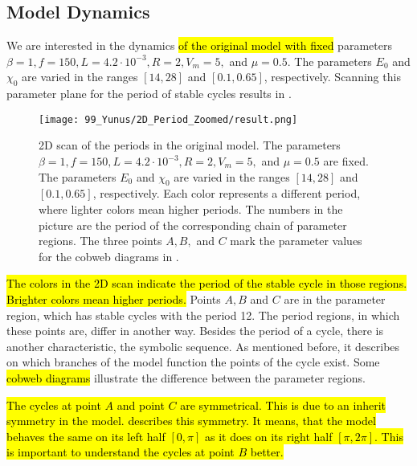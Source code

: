 \subsection{Model Dynamics}
\label{sec:state.og.dynamics}

We are interested in the dynamics \hl{of the original model with fixed} parameters $\beta = 1, f = 150, L = 4.2 \cdot 10^{-3}, R = 2, V_m = 5,$ and $\mu = 0.5$.
The parameters $E_0$ and $\chi_0$ are varied in the ranges $[14, 28]$ and $[0.1, 0.65]$, respectively.
Scanning this parameter plane for the period of stable cycles results in .

\begin{figure}
	\centering
	\texttt{[image: 99\_Yunus/2D\_Period\_Zoomed/result.png]}
	\caption[2D scan of the periods in the original model]{
		2D scan of the periods in the original model.
		The parameters $\beta = 1, f = 150, L = 4.2 \cdot 10^{-3}, R = 2, V_m = 5,$ and $\mu = 0.5$ are fixed.
		The parameters $E_0$ and $\chi_0$ are varied in the ranges $[14, 28]$ and $[0.1, 0.65]$, respectively.
		Each color represents a different period, where lighter colors mean higher periods.
		The numbers in the picture are the period of the corresponding chain of parameter regions.
		The three points $A, B,$ and $C$ mark the parameter values for the cobweb diagrams in .
	}
	\label{fig:setup.og.dynamics.period}
\end{figure}

\hl{
	The colors in the 2D scan  indicate the period of the stable cycle in those regions.
	Brighter colors mean higher periods.
}
Points $A, B$ and $C$ are in the parameter region, which has stable cycles with the period 12.
The period regions, in which these points are, differ in another way.
Besides the period of a cycle, there is another characteristic, the symbolic sequence.
As mentioned before, it describes on which branches of the model function the points of the cycle exist.
Some \hl{cobweb diagrams} illustrate the difference between the parameter regions.

\hl{
	The cycles at point $A$ and point $C$ are symmetrical.
	This is due to an inherit symmetry in the model.
	 describes this symmetry.
	It means, that the model behaves the same on its left half $[0, \pi]$ as it does on its right half $[\pi, 2\pi]$.
	This is important to understand the cycles at point $B$ better.
}

